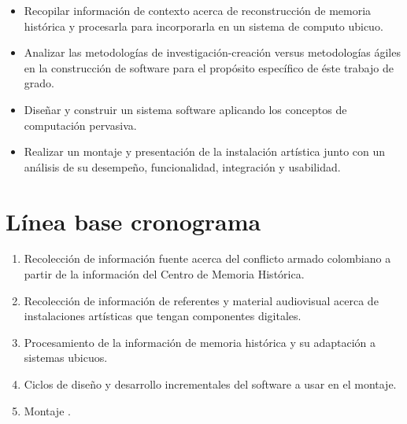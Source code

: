 \begin{itemize}

    \item Recopilar información de contexto acerca de reconstrucción de memoria histórica y procesarla para incorporarla en un sistema de computo ubicuo.
    
    \item Analizar las metodologías de investigación-creación versus metodologías ágiles en la construcción de software para el propósito específico de éste trabajo de grado.

    \item Diseñar y construir un sistema software aplicando los conceptos de computación pervasiva.

    \item Realizar un montaje y presentación de la instalación artística junto con un análisis de su desempeño, funcionalidad, integración y usabilidad.

\end{itemize}

\section{Línea base cronograma}

\begin{enumerate}
	\item \label{puntouno} Recolección de información fuente acerca del conflicto armado colombiano a partir de la información del Centro de Memoria Histórica.
	\item \label{puntodos} Recolección de información de referentes y material audiovisual acerca de instalaciones artísticas que tengan componentes digitales.
	\item \label{puntotres} Procesamiento de la información de memoria histórica y su adaptación a sistemas ubicuos.
	\item \label{puntocuatro} Ciclos de diseño y desarrollo incrementales del software a usar en el montaje.
	\item \label{puntocinco} Montaje .
	
	
	
	
\end{enumerate}

